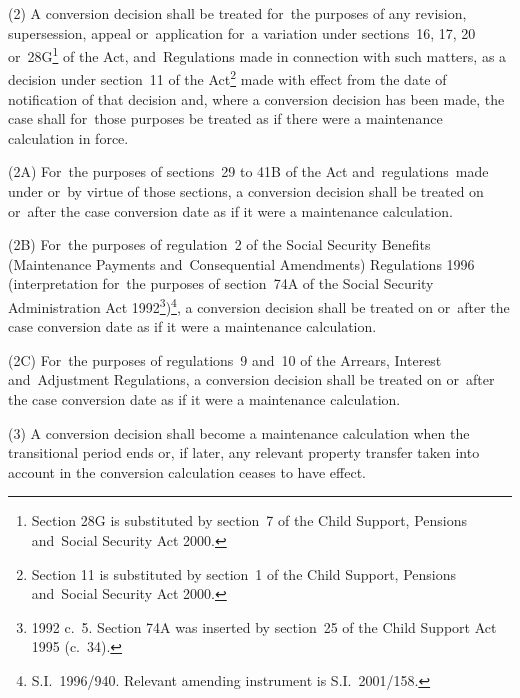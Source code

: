 \documentclass[12pt,a4paper]{article}
\begin{document}
(2) A conversion decision shall be treated for~the purposes of any revision, supersession, appeal or~application for~a variation under sections~16, 17, 20 or~28G\footnote{\frenchspacing Section 28G is substituted by section~7 of the Child Support, Pensions and~Social Security Act 2000.} of the Act, and~Regulations made in connection with such matters, as a decision under section~11 of the Act\footnote{\frenchspacing Section 11 is substituted by section~1 of the Child Support, Pensions and~Social Security Act 2000.} made with effect from the date of notification of that decision and, where a conversion decision has been made, the case shall for~those purposes be treated as if there were a maintenance calculation in force.

(2A) For~the purposes of sections~29 to 41B of the Act and~regulations~made under or~by virtue of those sections, a conversion decision shall be treated on or~after the case conversion date as if it were a maintenance calculation.

(2B) For~the purposes of regulation~2 of the Social Security Benefits (Maintenance Payments and~Consequential Amendments) Regulations 1996 (interpretation for~the purposes of section~74A of the Social Security Administration Act 1992\footnote{1992 c.\ 5. Section 74A was inserted by section~25 of the Child Support Act 1995 (c.\ 34).})\footnote{S.I.~1996/940. Relevant amending instrument is S.I.~2001/158.}, a conversion decision shall be treated on or~after the case conversion date as if it were a maintenance calculation.

(2C) For~the purposes of regulations~9 and~10 of the Arrears, Interest and~Adjustment Regulations, a conversion decision shall be treated on or~after the case conversion date as if it were a maintenance calculation.

(3) A 
conversion decision  %
shall become a maintenance calculation when the transitional period ends or, if later, any relevant property transfer taken into account in 
the conversion calculation  %
ceases to have effect.

\end{document}
